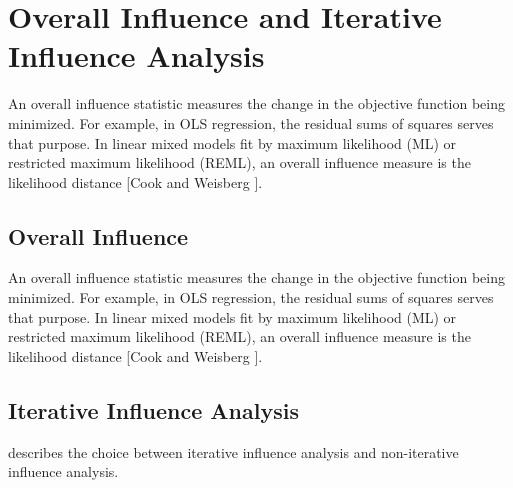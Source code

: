 \documentclass[Main.tex]{subfiles}
\begin{document}
		
\newpage
\section{Overall Influence and Iterative Influence Analysis}
			An overall influence statistic measures the change in the objective function being minimized. For example, in
			OLS regression, the residual sums of squares serves that purpose. In linear mixed models fit by
			 maximum likelihood (ML) or  restricted maximum likelihood (REML), an overall influence measure is the  likelihood distance [Cook and Weisberg ].
				
	
	\subsection{Overall Influence}
	An overall influence statistic measures the change in the objective function being minimized. For example, in
	OLS regression, the residual sums of squares serves that purpose. In linear mixed models fit by
	 maximum likelihood (ML) or  restricted maximum likelihood (REML), an overall influence measure is the  likelihood distance [Cook and Weisberg ].
		
	\subsection{Iterative Influence Analysis}
	
	
	
	\citet{schabenberger} describes the choice between  iterative influence analysis and  non-iterative influence analysis.
		
\end{document}
